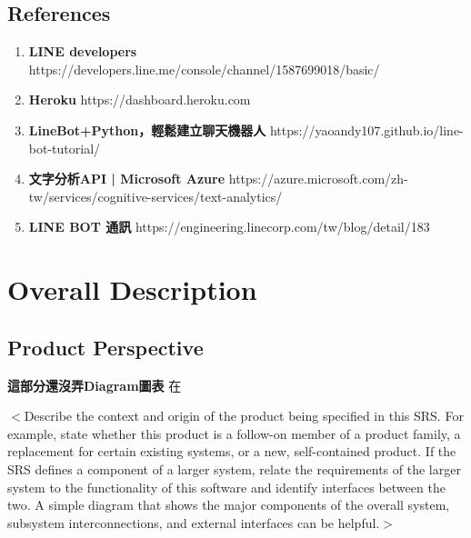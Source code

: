 \documentclass{scrreprt}
\begin{document}
\section{References}
\begin{CJK}{UTF8}{<font>}
\begin{enumerate} 
	\item \textbf {LINE developers} \newline
	https://developers.line.me/console/channel/1587699018/basic/
	\item  \textbf {Heroku} \newline
	https://dashboard.heroku.com
	\item \textbf {LineBot+Python，輕鬆建立聊天機器人} \newline
	https://yaoandy107.github.io/line-bot-tutorial/  
	\item  \textbf {文字分析API | Microsoft Azure}  \newline
	https://azure.microsoft.com/zh-tw/services/cognitive-services/text-analytics/
	\item  \textbf { LINE BOT 通訊}  \newline
	https://engineering.linecorp.com/tw/blog/detail/183
\end{enumerate}
\end{CJK}


\chapter{Overall Description}

\section{Product Perspective}
\begin{CJK}{UTF8}{<font>}
\textbf {\LARGE 這部分還沒弄Diagram圖表} \newline
在

$<$Describe the context and origin of the product being specified in this SRS.  
For example, state whether this product is a follow-on member of a product 
family, a replacement for certain existing systems, or a new, self-contained 
product. If the SRS defines a component of a larger system, relate the 
requirements of the larger system to the functionality of this software and 
identify interfaces between the two. A simple diagram that shows the major 
components of the overall system, subsystem interconnections, and external 
interfaces can be helpful.$>$
\end{CJK}
\end{document}
